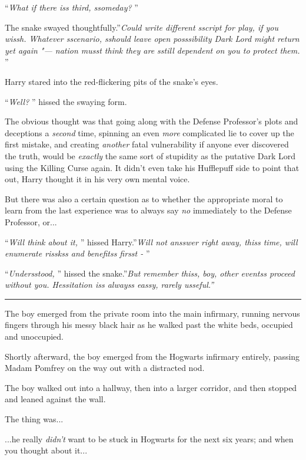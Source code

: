 ``\emph{What if there iss third, ssomeday?} ''

The snake swayed thoughtfully.''\emph{Could write different sscript for
play, if you wissh. Whatever sscenario, sshould leave open posssibility
Dark Lord might return yet again "--- nation musst think they are sstill
dependent on you to protect them.} ''

Harry stared into the red-flickering pits of the snake's eyes.

``\emph{Well?} '' hissed the swaying form.

The obvious thought was that going along with the Defense Professor's
plots and deceptions a \emph{second} time, spinning an even \emph{more}
complicated lie to cover up the first mistake, and creating
\emph{another} fatal vulnerability if anyone ever discovered the truth,
would be \emph{exactly} the same sort of stupidity as the putative Dark
Lord using the Killing Curse again. It didn't even take his Hufflepuff
side to point that out, Harry thought it in his very own mental voice.

But there was also a certain question as to whether the appropriate
moral to learn from the last experience was to always say \emph{no}
immediately to the Defense Professor, or...

``\emph{Will think about it,} '' hissed Harry.''\emph{Will not ansswer
right away, thiss time, will enumerate risskss and benefitss firsst -} ''

``\emph{Undersstood,} '' hissed the snake.''\emph{But remember thiss, boy,
other eventss proceed without you. Hessitation iss alwayss eassy, rarely
usseful.''}

\begin{center}\rule{3in}{0.4pt}\end{center}

The boy emerged from the private room into the main infirmary, running
nervous fingers through his messy black hair as he walked past the white
beds, occupied and unoccupied.

Shortly afterward, the boy emerged from the Hogwarts infirmary entirely,
passing Madam Pomfrey on the way out with a distracted nod.

The boy walked out into a hallway, then into a larger corridor, and then
stopped and leaned against the wall.

The thing was...

...he really \emph{didn't} want to be stuck in Hogwarts for the
next six years; and when you thought about it...

